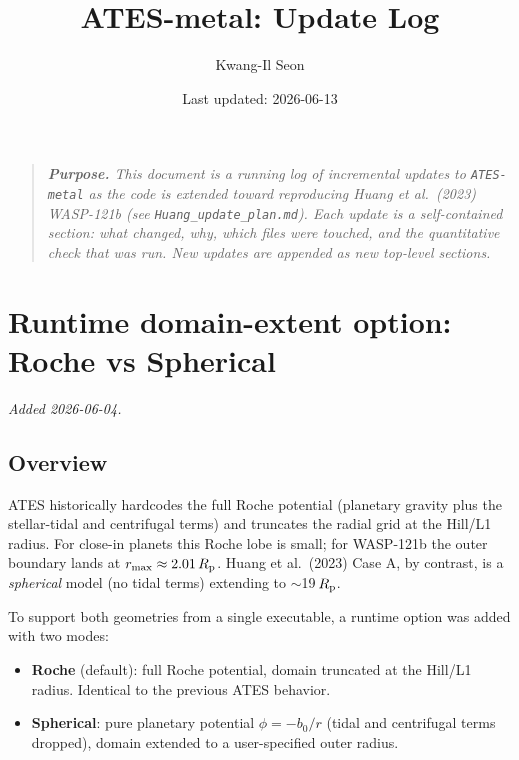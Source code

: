 \documentclass[english,a4paper]{kiseon_memo}
\begin{document}
\title{ATES-metal: Update Log}
\author{Kwang-Il Seon}
\date{Last updated: 2026-06-13}
\maketitle

\begin{quote}\small\itshape
\textbf{Purpose.} This document is a running log of incremental updates to
\texttt{ATES-metal} as the code is extended toward reproducing
Huang et al.\ (2023) WASP-121b (see \texttt{Huang\_update\_plan.md}). Each
update is a self-contained section: what changed, why, which files were
touched, and the quantitative check that was run. New updates are appended as
new top-level sections.
\end{quote}

\tableofcontents
\bigskip

\section{Runtime domain-extent option: Roche vs Spherical}
\textit{Added 2026-06-04.}

\subsection{Overview}

ATES historically hardcodes the full Roche potential (planetary gravity plus
the stellar-tidal and centrifugal terms) and truncates the radial grid at the
Hill/L1 radius. For close-in planets this Roche lobe is small; for WASP-121b
the outer boundary lands at $r_{\max}\approx2.01\,R_{\rm p}$. Huang et al.\
(2023) Case A, by contrast, is a \emph{spherical} model (no tidal terms)
extending to $\sim$19\,$R_{\rm p}$.

To support both geometries from a single executable, a runtime option was
added with two modes:

\begin{itemize}
\item \textbf{Roche} (default): full Roche potential, domain truncated at the
  Hill/L1 radius. Identical to the previous ATES behavior.
\item \textbf{Spherical}: pure planetary potential $\phi=-b_0/r$ (tidal and
  centrifugal terms dropped), domain extended to a user-specified outer radius.
\end{itemize}
\end{document}
